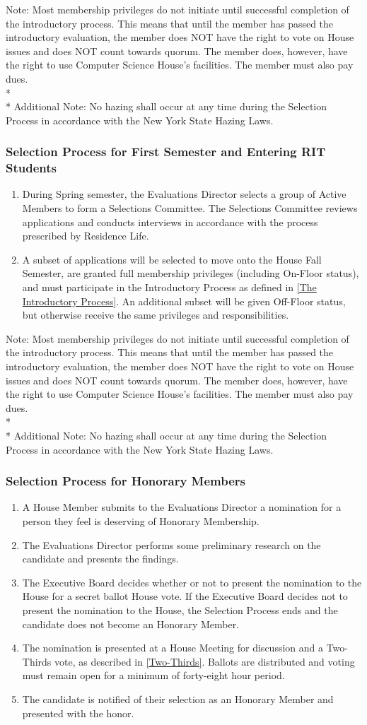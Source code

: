 \documentclass{article}
\newcommand{\bsubsection}[1]{\subsubsection{#1} \label{#1}}
\begin{document}
Note: Most membership privileges do not initiate until successful completion of the introductory process.
This means that until the member has passed the introductory evaluation, the member does NOT have the right to vote on House issues and does NOT count towards quorum.
The member does, however, have the right to use Computer Science House's facilities.
The member must also pay dues.
\\* \\*
Additional Note: No hazing shall occur at any time during the Selection Process in accordance with the New York State Hazing Laws.
\bsubsection{Selection Process for First Semester and Entering RIT Students}
\begin{enumerate}
	\item During Spring semester, the Evaluations Director selects a group of Active Members to form a Selections Committee.
		The Selections Committee reviews applications and conducts interviews in accordance with the process prescribed by Residence Life.
	\item A subset of applications will be selected to move onto the House Fall Semester, are granted full membership privileges (including On-Floor status), and must participate in the Introductory Process as defined in \ref{The Introductory Process}.
		An additional subset will be given Off-Floor status, but otherwise receive the same privileges and responsibilities.
\end{enumerate}
Note: Most membership privileges do not initiate until successful completion of the introductory process.
This means that until the member has passed the introductory evaluation, the member does NOT have the right to vote on House issues and does NOT count towards quorum.
The member does, however, have the right to use Computer Science House's facilities.
The member must also pay dues.
\\* \\*
Additional Note: No hazing shall occur at any time during the Selection Process in accordance with the New York State Hazing Laws.
\bsubsection{Selection Process for Honorary Members}
\begin{enumerate}
	\item A House Member submits to the Evaluations Director a nomination for a person they feel is deserving of Honorary Membership.
	\item The Evaluations Director performs some preliminary research on the candidate and presents the findings.
	\item The Executive Board decides whether or not to present the nomination to the House for a secret ballot House vote.
		If the Executive Board decides not to present the nomination to the House, the Selection Process ends and the candidate does not become an Honorary Member.
	\item The nomination is presented at a House Meeting for discussion and a Two-Thirds vote, as described in \ref{Two-Thirds}.
		Ballots are distributed and voting must remain open for a minimum of forty-eight hour period.
	\item The candidate is notified of their selection as an Honorary Member and presented with the honor.
\end{enumerate}
\end{document}
